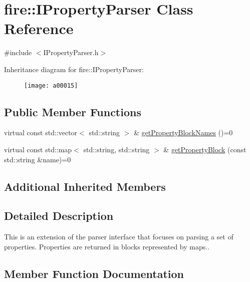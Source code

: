 \hypertarget{a00015}{}\section{fire\+:\+:I\+Property\+Parser Class Reference}
\label{a00015}


{\ttfamily \#include $<$I\+Property\+Parser.\+h$>$}

Inheritance diagram for fire\+:\+:I\+Property\+Parser\+:\begin{figure}[H]
\begin{center}
\leavevmode
\texttt{[image: a00015]}
\end{center}
\end{figure}
\subsection*{Public Member Functions}
\begin{DoxyCompactItemize}
\item 
virtual const std\+::vector$<$ std\+::string $>$ \& \hyperlink{a00015_a34602687f9d1affac7bd842102d4a6aa}{get\+Property\+Block\+Names} ()=0
\item 
virtual const std\+::map$<$ std\+::string, std\+::string $>$ \& \hyperlink{a00015_a34201371cb36dd09e96a66242ececb86}{get\+Property\+Block} (const std\+::string \&name)=0
\end{DoxyCompactItemize}
\subsection*{Additional Inherited Members}


\subsection{Detailed Description}
This is an extension of the parser interface that focuses on parsing a set of properties. Properties are returned in blocks represented by maps.. 

\subsection{Member Function Documentation}
